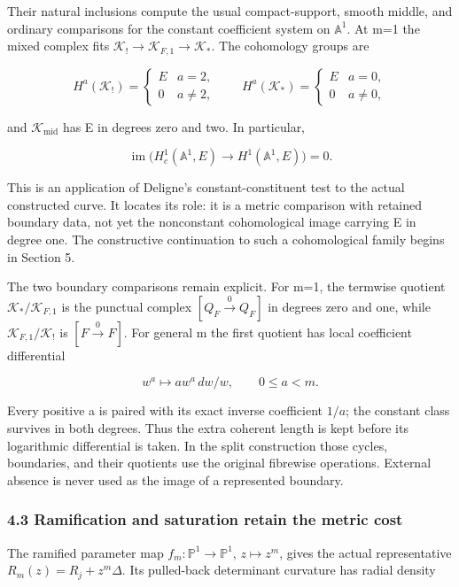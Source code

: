 \documentclass[
  11pt,
]{article}
\begin{document}
Their natural inclusions compute the usual compact-support, smooth
middle, and ordinary comparisons for the constant coefficient system on
\(\mathbb A^1\). At m=1 the mixed complex fits
\(\mathcal K_!\to\mathcal K_{F,1}\to\mathcal K_*\). The cohomology
groups are

\[
H^a(\mathcal K_!)=\begin{cases}E&a=2,\\0&a\ne2,\end{cases}
\qquad
H^a(\mathcal K_*)=\begin{cases}E&a=0,\\0&a\ne0,\end{cases}
\tag{16}
\]

and \(\mathcal K_{\mathrm{mid}}\) has E in degrees zero and two. In
particular,

\[
\boxed{\operatorname{im}\bigl(H_c^1(\mathbb A^1,E)\to H^1(\mathbb A^1,E)\bigr)=0.}
\tag{17}
\]

This is an application of Deligne's constant-constituent test to the
actual constructed curve. It locates its role: it is a metric comparison
with retained boundary data, not yet the nonconstant cohomological image
carrying E in degree one. The constructive continuation to such a
cohomological family begins in Section 5.

The two boundary comparisons remain explicit. For m=1, the termwise
quotient \(\mathcal K_*/\mathcal K_{F,1}\) is the punctual complex
\([Q_F\xrightarrow{0}Q_F]\) in degrees zero and one, while
\(\mathcal K_{F,1}/\mathcal K_!\) is \([F\xrightarrow{0}F]\). For
general m the first quotient has local coefficient differential

\[
 w^a\longmapsto a w^a\,dw/w,\qquad 0\le a<m.
\tag{18}
\]

Every positive a is paired with its exact inverse coefficient \(1/a\);
the constant class survives in both degrees. Thus the extra coherent
length is kept before its logarithmic differential is taken. In the
split construction those cycles, boundaries, and their quotients use the
original fibrewise operations. External absence is never used as the
image of a represented boundary.

\subsubsection{4.3 Ramification and saturation retain the metric
cost}\label{ramification-and-saturation-retain-the-metric-cost}

The ramified parameter map \(f_m:\mathbb P^1\to\mathbb P^1\),
\(z\mapsto z^m\), gives the actual representative
\(R_m(z)=R_j+z^m\Delta\). Its pulled-back determinant curvature has
radial density
\end{document}
